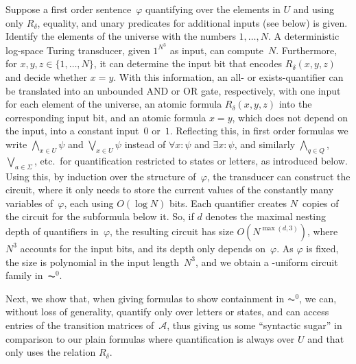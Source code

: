 Suppose a first order sentence~$\varphi$ quantifying over the elements in $U$
and using only $R_{\delta}$, equality, and unary predicates for additional inputs (see below) is given.
Identify the elements of the universe with the numbers $1, \ldots, N$.
A deterministic log-space Turing transducer, given $1^{N^3}$ as input,
can compute~$N$.
Furthermore, for $x, y, z \in \{1,\ldots,N\}$,
it can determine the input bit that encodes $R_{\delta}(x,y,z)$
and decide whether $x = y$.
With this information, an all- or exists-quantifier can be translated
into an unbounded {\sc AND} or {\sc OR} gate, respectively,
with one input for each element of the universe,
an atomic formula $R_{\delta}(x,y,z)$ into the corresponding input bit,
and an atomic formula $x = y$, which does not depend on the input,
into a constant input~$0$ or~$1$.
Reflecting this, in first order formulas we write $\bigwedge_{x \in U} \psi$ and $\bigvee_{x \in U} \psi$
instead of $\forall x \colon \psi$ and $\exists x \colon \psi$,
and similarly $\bigwedge_{q \in Q}$, $\bigvee_{a \in \Sigma}$, etc.\ for quantification
restricted to states or letters, as introduced below.
Using this, by induction over the structure of~$\varphi$,
the transducer can construct the circuit,
where it only needs to store the current values of the constantly many variables of~$\varphi$,
each using $O(\log N)$ bits.
Each quantifier creates $N$~copies of the circuit for the subformula below it.
So, if $d$ denotes the maximal nesting depth of quantifiers in~$\varphi$,
the resulting circuit has size $O(N^{\max(d,3)})$, where $N^3$ accounts for the input bits,
and its depth only depends on~$\varphi$.
As $\varphi$ is fixed, the size is polynomial in the input length~$N^3$,
and we obtain a \LOGSPACE-uniform circuit family in~$\AC^0$.

Next, we show that, when giving formulas to show containment in $\AC^0$,
we can, without loss of generality, quantify only over letters or states,
and can access entries of the transition matrices of~$\mathcal A$, thus
giving us some ``syntactic sugar'' in comparison to our plain formulas
where quantification is always over $U$ and that only uses
the relation $R_{\delta}$.

